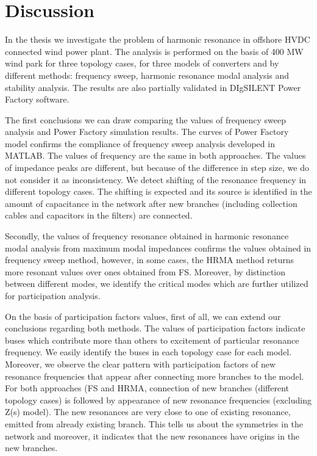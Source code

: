 \documentclass[12pt]{report} %
\begin{document}
\section{Discussion}
In the thesis we investigate the problem of harmonic resonance in offshore HVDC connected wind power plant. The analysis is performed on the basis of 400 MW wind park for three topology cases, for three models of converters and by different methods: frequency sweep, harmonic resonance modal analysis and stability analysis. The results are also partially validated in DIgSILENT Power Factory software.

The first conclusions we can draw comparing the values of frequency sweep analysis and Power Factory simulation results. The curves of Power Factory model confirms the compliance of frequency sweep analysis developed in MATLAB. The values of frequency are the same in both approaches. The values of impedance peaks are different, but because of the difference in step size, we do not consider it as inconsistency. We detect shifting of the resonance frequency in different topology cases. The shifting is expected and its source is identified in the amount of capacitance in the network after new branches (including collection cables and capacitors in the filters) are connected.

Secondly, the values of frequency resonance obtained in harmonic resonance modal analysis from maximum modal impedances confirms the values obtained in frequency sweep method, however, in some cases, the HRMA method returns more resonant values over ones obtained from FS. Moreover, by distinction between different modes, we identify the critical modes which are further utilized for participation analysis.

On the basis of participation factors values, first of all, we can extend our conclusions regarding both methods. The values of participation factors indicate buses which contribute more than others to excitement of particular resonance frequency. We easily identify the buses in each topology case for each model. Moreover, we observe the clear pattern with participation factors of new resonance frequencies that appear after connecting more branches to the model. For both approaches (FS and HRMA, connection of new branches (different topology cases) is followed by appearance of new resonance frequencies (excluding Z(s) model). The new resonances are very close to one of existing resonance, emitted from already existing branch. This tells us about the symmetries in the network and moreover, it indicates that the new resonances have origins in the new branches.
\end{document}

